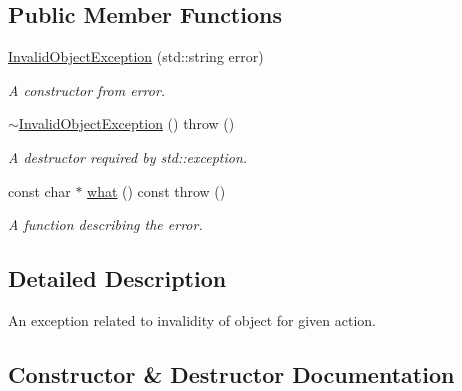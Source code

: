 \subsection*{Public Member Functions}
\begin{DoxyCompactItemize}
\item 
\hyperlink{class_r_c_f_1_1_common_1_1_invalid_object_exception_a3df9541e454574a3d5e6ecc4f90421e9}{Invalid\+Object\+Exception} (std\+::string error)
\begin{DoxyCompactList}\small\item\em A constructor from error. \end{DoxyCompactList}\item 
\hypertarget{class_r_c_f_1_1_common_1_1_invalid_object_exception_a061366b76ff482223c728682784c6cac}{}\hyperlink{class_r_c_f_1_1_common_1_1_invalid_object_exception_a061366b76ff482223c728682784c6cac}{$\sim$\+Invalid\+Object\+Exception} ()  throw ()\label{class_r_c_f_1_1_common_1_1_invalid_object_exception_a061366b76ff482223c728682784c6cac}

\begin{DoxyCompactList}\small\item\em A destructor required by std\+::exception. \end{DoxyCompactList}\item 
const char $\ast$ \hyperlink{class_r_c_f_1_1_common_1_1_invalid_object_exception_a9641c4c66f1b08965e126b651e457b7f}{what} () const   throw ()
\begin{DoxyCompactList}\small\item\em A function describing the error. \end{DoxyCompactList}\end{DoxyCompactItemize}


\subsection{Detailed Description}
An exception related to invalidity of object for given action. 

\subsection{Constructor \& Destructor Documentation}
\hypertarget{class_r_c_f_1_1_common_1_1_invalid_object_exception_a3df9541e454574a3d5e6ecc4f90421e9}{}
